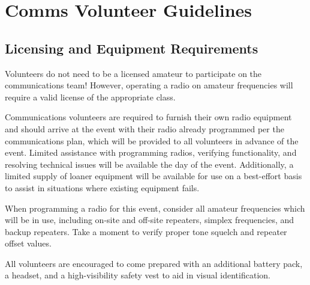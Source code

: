\documentclass[pdflatex,letterpaper,twoside,12pt]{book}
\begin{document}

\chapter{Comms Volunteer Guidelines}

\iffalse %
 * You are an event guide and a Professional Communicator, be visible
   and answer questions, help out, go above and beyond 
\fi %

\section{Licensing and Equipment Requirements}

Volunteers do not need to be a licensed amateur to participate on the communications team!  However, operating a radio on amateur frequencies will require a valid license of the appropriate class.

Communications volunteers are required to furnish their own radio equipment and should arrive at the event with their radio already programmed per the communications plan, which will be provided to all volunteers in advance of the event.  Limited assistance with programming radios, verifying functionality, and resolving technical issues will be available the day of the event.  Additionally, a limited supply of loaner equipment will be available for use on a best-effort basis to assist in situations where existing equipment fails.

When programming a radio for this event, consider all amateur frequencies which will be in use, including on-site and off-site repeaters, simplex frequencies, and backup repeaters.  Take a moment to verify proper tone squelch and repeater offset values.

All volunteers are encouraged to come prepared with an additional battery pack, a headset, and a high-visibility safety vest to aid in visual identification.

\end{document}
